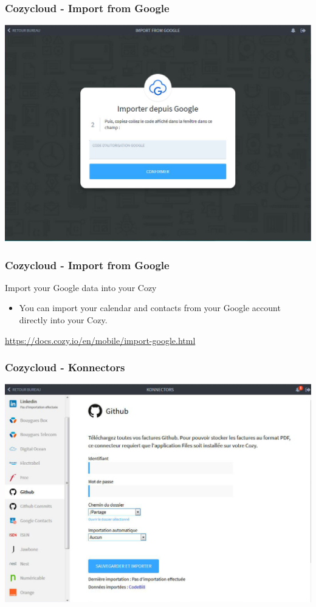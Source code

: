 \documentclass{beamer}
\begin{document}
\begin{frame}
\frametitle{Cozycloud - Import from Google}
\includegraphics[scale=0.3] {./CozyCloud/CozyCloud_Import_From_Google.jpg}
\end{frame}

\begin{frame}
\frametitle{Cozycloud - Import from Google}
\begin{block}{Import your Google data into your Cozy}
\begin{itemize}
\item You can import your calendar and contacts from your Google account directly into your Cozy.
\end{itemize}
\url{https://docs.cozy.io/en/mobile/import-google.html}
\end{block}
\end{frame}

\begin{frame}
\frametitle{Cozycloud - Konnectors}
\includegraphics[scale=0.3] {./CozyCloud/CozyCloud_Konnectors.jpg}
\end{frame}
\end{document}

